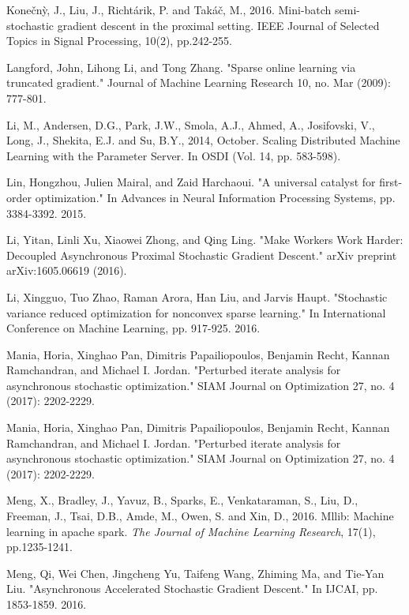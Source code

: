 \documentclass[10pt, conference, compsocconf]{IEEEtran}
\theoremstyle{definition}
\theoremstyle{remark}
\begin{document}
\begin{thebibliography}{99}
 Kone{\v{c}}n{\`y}, J., Liu, J., Richt{\'a}rik, P. and Tak{\'a}{\v{c}}, M., 2016. Mini-batch semi-stochastic gradient descent in the proximal setting. IEEE Journal of Selected Topics in Signal Processing, 10(2), pp.242-255.

 Langford, John, Lihong Li, and Tong Zhang. "Sparse online learning via truncated gradient." Journal of Machine Learning Research 10, no. Mar (2009): 777-801.

 Li, M., Andersen, D.G., Park, J.W., Smola, A.J., Ahmed, A., Josifovski, V., Long, J., Shekita, E.J. and Su, B.Y., 2014, October. Scaling Distributed Machine Learning with the Parameter Server. In OSDI (Vol. 14, pp. 583-598).

 Lin, Hongzhou, Julien Mairal, and Zaid Harchaoui. "A universal catalyst for first-order optimization." In Advances in Neural Information Processing Systems, pp. 3384-3392. 2015.

 Li, Yitan, Linli Xu, Xiaowei Zhong, and Qing Ling. "Make Workers Work Harder: Decoupled Asynchronous Proximal Stochastic Gradient Descent." arXiv preprint arXiv:1605.06619 (2016).

 Li, Xingguo, Tuo Zhao, Raman Arora, Han Liu, and Jarvis Haupt. "Stochastic variance reduced optimization for nonconvex sparse learning." In International Conference on Machine Learning, pp. 917-925. 2016.

 Mania, Horia, Xinghao Pan, Dimitris Papailiopoulos, Benjamin Recht, Kannan Ramchandran, and Michael I. Jordan. "Perturbed iterate analysis for asynchronous stochastic optimization." SIAM Journal on Optimization 27, no. 4 (2017): 2202-2229.

 Mania, Horia, Xinghao Pan, Dimitris Papailiopoulos, Benjamin Recht, Kannan Ramchandran, and Michael I. Jordan. "Perturbed iterate analysis for asynchronous stochastic optimization." SIAM Journal on Optimization 27, no. 4 (2017): 2202-2229.

Meng, X., Bradley, J., Yavuz, B., Sparks, E., Venkataraman, S., Liu, D., Freeman, J., Tsai, D.B., Amde, M., Owen, S. and Xin, D., 2016. Mllib: Machine learning in apache spark. {\it The Journal of Machine Learning Research}, 17(1), pp.1235-1241.

 Meng, Qi, Wei Chen, Jingcheng Yu, Taifeng Wang, Zhiming Ma, and Tie-Yan Liu. "Asynchronous Accelerated Stochastic Gradient Descent." In IJCAI, pp. 1853-1859. 2016.


\end{thebibliography}
\end{document}
